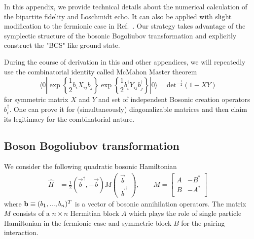 
In this appendix, we provide technical details about the numerical calculation of the bipartite fidelity and Loschmidt echo. It can also be applied with slight modification to the fermionic case in Ref.~. Our strategy takes advantage of the symplectic structure of the bosonic Bogoliubov transformation and explicitly construct the "BCS" like ground state. 

During the course of derivation in this and other appendices, we will repeatedly use the combinatorial identity called McMahon Master theorem
\begin{equation}
\label{eq:bosonic_McMahon}
\langle0|\exp\left\{\frac{1}{2}b_iX_{ij}b_j\right\}\exp\left\{\frac{1}{2}b^\dagger_iY_{ij}b^\dagger_j\right\}|0\rangle=\text{det}^{-\frac{1}{2}}(1-XY)
\end{equation}
for symmetric matrix $X$ and $Y$ and set of independent Bosonic creation operators $b_i^{\dagger}$. One can prove it for (simultaneously) diagonalizable matrices and then claim its legitimacy for the combinatorial nature. 

\subsection{Boson Bogoliubov transformation}
\label{app_sub:boson_BdG}
We consider the following quadratic bosonic Hamiltonian
\begin{equation}\begin{aligned}
\label{eq:quadratic_boson_H}
\hat{H}
&=
\frac{1}{2} (\vec{b}^{\dagger}, -\vec{b})
M 
\begin{pmatrix}
\vec{b}\\
\vec{b}^{\dagger} 
\end{pmatrix},  \qquad 
M = 
\begin{bmatrix}
A & -B^* \\
B & -A^* \\
\end{bmatrix}
\end{aligned}\end{equation}
where ${\bf b}\equiv(b_{1},...,b_{n})^T$ is a vector of bosonic annihilation operators. The matrix $M$ consists of a $n\times n$ Hermitian block $A$ which plays the role of single particle Hamiltonian in the fermionic case and symmetric block $B$ for the pairing interaction. 


